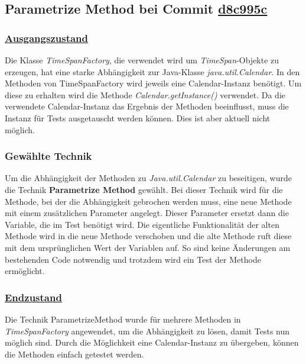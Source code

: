 \newpage

\subsection{Parametrize Method bei Commit \href{https://github.com/lukaspanni/OpenSourceStats/commit/d8c995c387a792a6d83c852119760b0c57a63c02} {d8c995c}}

\subsubsection*{\href{https://github.com/lukaspanni/OpenSourceStats/tree/eafe840d0bfc8a08beca01709003d5afe7e59963/app/src/main/java/de/lukaspanni/opensourcestats/util/TimeSpanFactory.java}{Ausgangszustand}}
Die Klasse \textit{TimeSpanFactory}, die verwendet wird um \textit{TimeSpan}-Objekte zu erzeugen, hat eine starke Abhängigkeit zur Java-Klasse \textit{java.util.Calendar}.
In den Methoden von TimeSpanFactory wird jeweils eine Calendar-Instanz benötigt. 
Um diese zu erhalten wird die Methode \textit{Calendar.getInstance()} verwendet.
Da die verwendete Calendar-Instanz das Ergebnis der Methoden beeinflusst, muss die Instanz für Tests ausgetauscht werden können.
Dies ist aber aktuell nicht möglich.

\subsubsection*{Gewählte Technik}
Um die Abhängigkeit der Methoden zu \textit{Java.util.Calendar} zu beseitigen, wurde die Technik \textbf{Parametrize Method} gewählt.
Bei dieser Technik wird für die Methode, bei der die Abhängigkeit gebrochen werden muss, eine neue Methode mit einem zusätzlichen Parameter angelegt.
Dieser Parameter ersetzt dann die Variable, die im Test benötigt wird.
Die eigentliche Funktionalität der alten Methode wird in die neue Methode verschoben und die alte Methode ruft diese mit dem ursprünglichen Wert der Variablen auf.
So sind keine Änderungen am bestehenden Code notwendig und trotzdem wird ein Test der Methode ermöglicht.

\subsubsection*{\href{https://github.com/lukaspanni/OpenSourceStats/tree/d8c995c387a792a6d83c852119760b0c57a63c02/app/src/main/java/de/lukaspanni/opensourcestats/util/TimeSpanFactory.java}{Endzustand}}

Die Technik ParametrizeMethod wurde für mehrere Methoden in \textit{TimeSpanFactory} angewendet, um die Abhängigkeit zu lösen, damit Tests nun möglich sind.
Durch die Möglichkeit eine Calendar-Instanz zu übergeben, können die Methoden einfach getestet werden.

